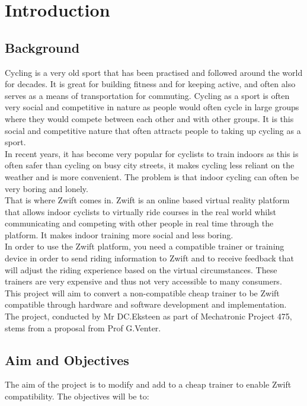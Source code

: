 \chapter{Introduction}
\section{Background}

Cycling is a very old sport that has been practised and followed around the world for decades. It is great for building fitness and for keeping active, and often also serves as a means of transportation for commuting. Cycling as a sport is often very social and competitive in nature as people would often cycle in large groups where they would compete between each other and with other groups. It is this social and competitive nature that often attracts people to taking up cycling as a sport.\\
In recent years, it has become very popular for cyclists to train indoors as this is often safer than cycling on busy city streets, it makes cycling less reliant on the weather and is more convenient. The problem is that indoor cycling can often be very boring and lonely. \\
That is where Zwift comes in. Zwift is an online based virtual reality platform that allows indoor cyclists to virtually ride courses in the real world whilst communicating and competing with other people in real time through the platform. It makes indoor training more social and less boring.\\
In order to use the Zwift platform, you need a compatible trainer or training device in order to send riding information to Zwift and to receive feedback that will adjust the riding experience based on the virtual circumstances. These trainers are very expensive and thus not very accessible to many consumers.\\
This project will aim to convert a non-compatible cheap trainer to be Zwift compatible through hardware and software development and implementation. The project, conducted by Mr DC.Eksteen as part of Mechatronic Project 475, stems from a proposal from Prof G.Venter.

\section{Aim and Objectives}

The aim of the project is to modify and add to a cheap trainer to enable Zwift compatibility.
The objectives will be to: 

